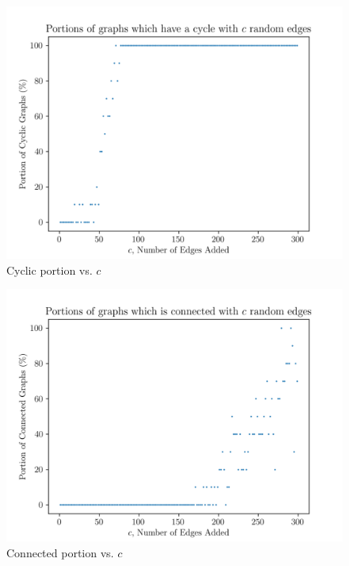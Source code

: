 \documentclass[titlepage, 12pt]{article}
\begin{document}
\begin{figure}[h]
  \centering
  \includegraphics[width=0.8\linewidth]{cyclic}
  \caption{Cyclic portion vs. \(c\)}
  \label{fig:cyclic}
\end{figure}
\begin{figure}[h]
  \centering
  \includegraphics[width=0.8\linewidth]{connect}
  \caption{Connected portion vs. \(c\)}
  \label{fig:connect}
\end{figure}
\end{document}
